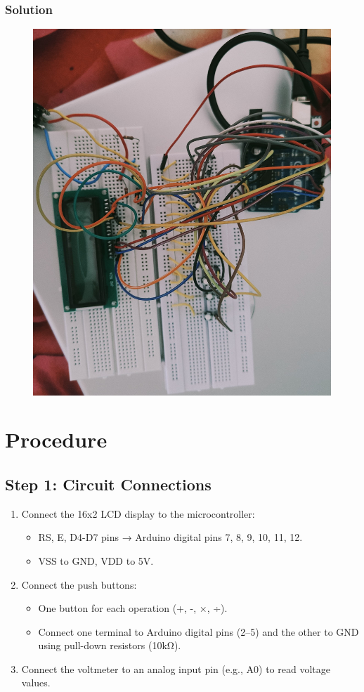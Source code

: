 \documentclass[a4paper,12pt]{article}
\begin{document}
\newpage
\begin{frame}
\frametitle{Solution}
        \begin{figure}[h]
        \centering
       \includegraphics[width=0.5\linewidth]{figs/cal.jpeg}
       \caption{}
       \label{graph}
    \end{figure}

\section{Procedure}

\subsection{Step 1: Circuit Connections}
\begin{enumerate}
    \item Connect the {16x2 LCD display} to the microcontroller:
    \begin{itemize}
        \item RS, E, D4-D7 pins → Arduino digital pins 7, 8, 9, 10, 11, 12.
        \item VSS to {GND}, VDD to {5V}.
    \end{itemize}
    \item Connect the {push buttons}:
    \begin{itemize}
        \item One button for each operation (+, -, ×, ÷).
        \item Connect one terminal to Arduino digital pins (2–5) and the other to GND using pull-down resistors (10kΩ).
    \end{itemize}
    \item Connect the {voltmeter} to an analog input pin (e.g., A0) to read voltage values.
\end{enumerate}

\end{frame}
\end{document}
